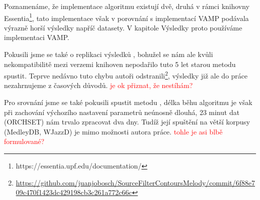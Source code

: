 Poznamenáme, že implementace algoritmu \cite{Salamon2012a} existují dvě, druhá v rámci knihovny Essentia\footnote{https://essentia.upf.edu/documentation/}, tato implementace však v porovnání s implementací VAMP podávala výrazně horší výsledky napříč datasety. V kapitole Výsledky proto používáme implementaci VAMP.

Pokusili jsme se také o replikaci výsledků \cite{Bosch2014}, bohužel se nám ale kvůli nekompatibilitě mezi verzemi knihoven nepodařilo tuto 5 let starou metodu spustit. Teprve nedávno tuto chybu autoři odstranili\footnote{\url{https://github.com/juanjobosch/SourceFilterContoursMelody/commit/6f88e709c470f1423dc429198cb3c261a772c66c}}, výsledky již ale do práce nezahrnujeme z časových důvodů. \textcolor{red}{je ok přiznat, že nestíhám?}

Pro srovnání jsme se také pokusili spustit metodu \cite{Durrieu2010}, délka běhu algoritmu je však při zachování výchozího nastavení parametrů neúnosně dlouhá, 23 minut dat (ORCHSET) nám trvalo zpracovat dva dny. Tudíž její spuštění na větší korpusy (MedleyDB, WJazzD) je mimo možnosti autora práce. \textcolor{red}{tohle je asi blbě formulované?}

